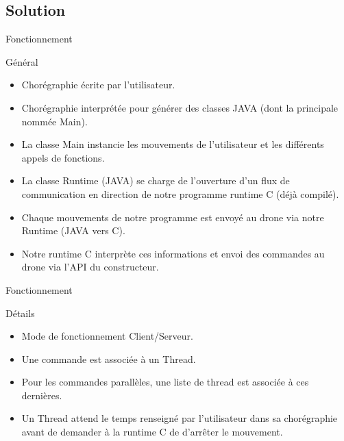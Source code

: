 \documentclass{bredelebeamer}
\begin{document}
\subsection{Solution}
\begin{frame}{Fonctionnement}
\begin{block}{Général}
	\begin{itemize}
    \item Chorégraphie écrite par l'utilisateur. \pause
    \item Chorégraphie interprétée pour générer des classes JAVA (dont la principale nommée Main). \pause
    \item La classe Main instancie les mouvements de l'utilisateur et les différents appels de fonctions. \pause
    \item La classe Runtime (JAVA) se charge de l'ouverture d'un flux de communication en direction de notre programme runtime C (déjà compilé). \pause
    \item Chaque mouvements de notre programme est envoyé au drone via notre Runtime (JAVA vers C). \pause
    \item Notre runtime C interprète ces informations et envoi des commandes au drone via l'API du constructeur.
	\end{itemize}
\end{block}
\end{frame}

\begin{frame}{Fonctionnement}
\begin{exampleblock}{Détails}
\begin{itemize}
\item Mode de fonctionnement Client/Serveur.
\item Une commande est associée à un Thread.
\item Pour les commandes parallèles, une liste de thread est associée à ces dernières.
\item Un Thread attend le temps renseigné par l'utilisateur dans sa chorégraphie avant de demander à la runtime C de d'arrêter le mouvement.
\end{itemize}
\end{exampleblock}
\end{frame}
\end{document}
